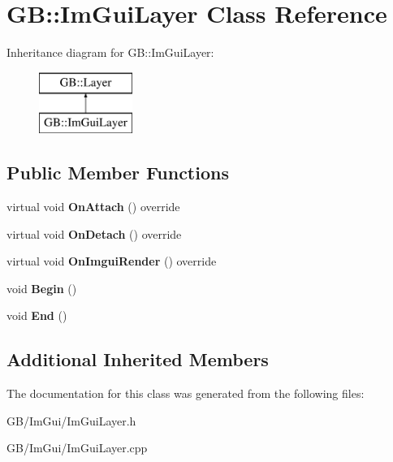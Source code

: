 \hypertarget{class_g_b_1_1_im_gui_layer}{}\section{GB\+::Im\+Gui\+Layer Class Reference}
\label{class_g_b_1_1_im_gui_layer}
Inheritance diagram for GB\+::Im\+Gui\+Layer\+:\begin{figure}[H]
\begin{center}
\leavevmode
\includegraphics[height=2.000000cm]{class_g_b_1_1_im_gui_layer}
\end{center}
\end{figure}
\subsection*{Public Member Functions}
\begin{DoxyCompactItemize}
\item 
\mbox{\label{class_g_b_1_1_im_gui_layer_aa373907ea7cacb3e65d2202b5f3984b3}} 
virtual void {\bfseries On\+Attach} () override
\item 
\mbox{\label{class_g_b_1_1_im_gui_layer_a0b8aa90a0ac004da0a318e97979c2b0f}} 
virtual void {\bfseries On\+Detach} () override
\item 
\mbox{\label{class_g_b_1_1_im_gui_layer_a0f7ca3de9d06a72e353d1c8f17349340}} 
virtual void {\bfseries On\+Imgui\+Render} () override
\item 
\mbox{\label{class_g_b_1_1_im_gui_layer_a93fb9df02f6ec2fca9fd2cebbf804741}} 
void {\bfseries Begin} ()
\item 
\mbox{\label{class_g_b_1_1_im_gui_layer_a9b556f4d7414d713b410de05002bab7f}} 
void {\bfseries End} ()
\end{DoxyCompactItemize}
\subsection*{Additional Inherited Members}


The documentation for this class was generated from the following files\+:\begin{DoxyCompactItemize}
\item 
G\+B/\+Im\+Gui/Im\+Gui\+Layer.\+h\item 
G\+B/\+Im\+Gui/Im\+Gui\+Layer.\+cpp\end{DoxyCompactItemize}
